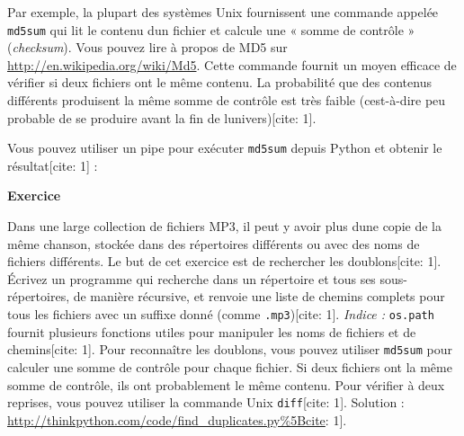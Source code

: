 Par exemple, la plupart des systèmes Unix fournissent une commande
appelée \texttt{md5sum} qui lit le contenu d\textquotesingle un fichier
et calcule une « somme de contrôle » (\emph{checksum}). Vous pouvez lire
à propos de MD5 sur \url{http://en.wikipedia.org/wiki/Md5}. Cette
commande fournit un moyen efficace de vérifier si deux fichiers ont le
même contenu. La probabilité que des contenus différents produisent la
même somme de contrôle est très faible (c\textquotesingle est-à-dire peu
probable de se produire avant la fin de
l\textquotesingle univers){[}cite: 1{]}.

Vous pouvez utiliser un pipe pour exécuter \texttt{md5sum} depuis Python
et obtenir le résultat{[}cite: 1{]} :

\begin{Shaded}
\begin{Highlighting}[]
\OperatorTok{\textgreater{}\textgreater{}\textgreater{}}\OperatorTok{=} 
\OperatorTok{\textgreater{}\textgreater{}\textgreater{}}\OperatorTok{=}  \OperatorTok{+}
\OperatorTok{\textgreater{}\textgreater{}\textgreater{}}\OperatorTok{=}
\OperatorTok{\textgreater{}\textgreater{}\textgreater{}}\OperatorTok{=}
\OperatorTok{\textgreater{}\textgreater{}\textgreater{}}\OperatorTok{=}
\OperatorTok{\textgreater{}\textgreater{}\textgreater{}} 
\OperatorTok{\textgreater{}\textgreater{}\textgreater{}} 
\end{Highlighting}
\end{Shaded}

\textbf{Exercice}

Dans une large collection de fichiers MP3, il peut y avoir plus
d\textquotesingle une copie de la même chanson, stockée dans des
répertoires différents ou avec des noms de fichiers différents. Le but
de cet exercice est de rechercher les doublons{[}cite: 1{]}. Écrivez un
programme qui recherche dans un répertoire et tous ses sous-répertoires,
de manière récursive, et renvoie une liste de chemins complets pour tous
les fichiers avec un suffixe donné (comme \texttt{.mp3}){[}cite: 1{]}.
\emph{Indice :} \texttt{os.path} fournit plusieurs fonctions utiles pour
manipuler les noms de fichiers et de chemins{[}cite: 1{]}. Pour
reconnaître les doublons, vous pouvez utiliser \texttt{md5sum} pour
calculer une somme de contrôle pour chaque fichier. Si deux fichiers ont
la même somme de contrôle, ils ont probablement le même contenu. Pour
vérifier à deux reprises, vous pouvez utiliser la commande Unix
\texttt{diff}{[}cite: 1{]}. Solution :
\url{http://thinkpython.com/code/find_duplicates.py\%5Bcite}: 1{]}.

